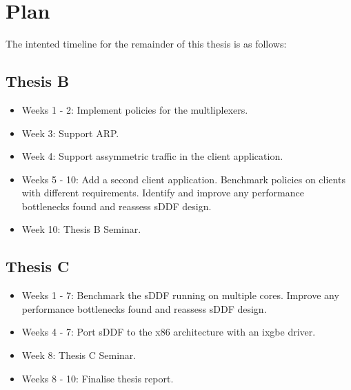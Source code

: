 \chapter{Plan}\label{ch:plan}

The intented timeline for the remainder of this thesis is as follows:

\section{Thesis B}

\begin{itemize}
\item Weeks 1 - 2: Implement policies for the multliplexers.
\item Week 3: Support ARP.
\item Week 4: Support assymmetric traffic in the client application.
\item Weeks 5 - 10: Add a second client application. Benchmark policies on clients with different requirements. Identify
and improve any performance bottlenecks found and reassess sDDF design.
\item Week 10: Thesis B Seminar.
\end{itemize}

\section{Thesis C}

\begin{itemize}
    \item Weeks 1 - 7: Benchmark the sDDF running on multiple cores. Improve any performance 
        bottlenecks found and reassess sDDF design. 
    \item Weeks 4 - 7: Port sDDF to the x86 architecture with an ixgbe driver.
    \item Week 8: Thesis C Seminar.
    \item Weeks 8 - 10: Finalise thesis report.
\end{itemize}
